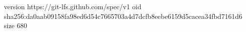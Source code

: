 version https://git-lfs.github.com/spec/v1
oid sha256:da0aab09158fa98ed6d54c7665703a4d7dcfb8eebe6159d5cacea34fbd7161d6
size 680
